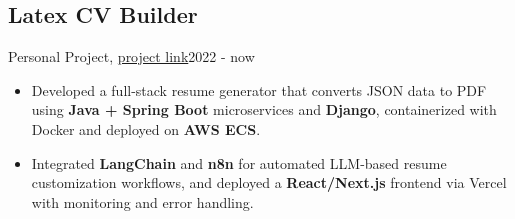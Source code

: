 \subsection{Latex CV Builder}{Personal Project, \href{https://github.com/Danial-Kord/Latex-CV-Builder}{project link}}{2022 - now}
\begin{itemize}
    \item Developed a full-stack resume generator that converts JSON data to PDF using \textbf{Java + Spring Boot} microservices and \textbf{Django}, containerized with Docker and deployed on \textbf{AWS ECS}.
    \item Integrated \textbf{LangChain} and \textbf{n8n} for automated LLM-based resume customization workflows, and deployed a \textbf{React/Next.js} frontend via Vercel with monitoring and error handling.
\end{itemize}

